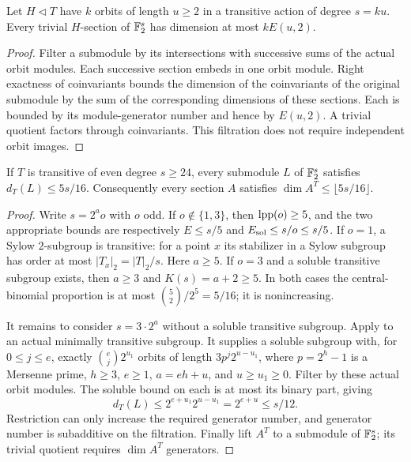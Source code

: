 \begin{lemma}\label{lem:orbit-filtration}
Let $H\lhd T$ have $k$ orbits of length $u\geq2$ in a transitive
action of degree $s=ku$. Every trivial $H$-section of $\mathbb F_2^s$ has
dimension at most $kE(u,2)$.
\end{lemma}
\begin{proof}
Filter a submodule by its intersections with successive sums of the
actual orbit modules. Each successive section embeds in one orbit
module. Right exactness of coinvariants bounds the dimension of the
coinvariants of the original submodule by the sum of the corresponding
dimensions of these sections. Each is bounded by its module-generator
number and hence by $E(u,2)$. A trivial quotient factors through
coinvariants. This filtration does not require independent orbit images.
\end{proof}

\begin{lemma}\label{lem:five-sixteenths}
If $T$ is transitive of even degree $s\geq24$, every submodule $L$ of
$\mathbb F_2^s$ satisfies $d_T(L)\leq5s/16$. Consequently every section $A$
satisfies $\dim A^T\leq\lfloor5s/16\rfloor$.
\end{lemma}
\begin{proof}
Write $s=2^ao$ with $o$ odd. If $o\notin\{1,3\}$, then
$\operatorname{lpp}(o)\geq5$, and the two appropriate bounds are respectively
$E\leq s/5$ and $E_{\rm sol}\leq s/o\leq s/5$.
If $o=1$, a Sylow $2$-subgroup is transitive: for a point $x$ its
stabilizer in a Sylow subgroup has order at most $|T_x|_2=|T|_2/s$.
Here $a\geq5$. If $o=3$ and a soluble transitive subgroup exists, then
$a\geq3$ and $K(s)=a+2\geq5$. In both cases the central-binomial
proportion is at most $\binom52/2^5=5/16$; it is nonincreasing.

It remains to consider $s=3\cdot2^a$ without a soluble transitive
subgroup. Apply \cite[Corollary 3.12]{Tracey2018} to an actual minimally
transitive subgroup. It supplies a soluble subgroup with, for
$0\leq j\leq e$, exactly $\binom ej2^{u_1}$ orbits of length
$3p^j2^{u-u_1}$, where $p=2^h-1$ is a Mersenne prime,
$h\geq3$, $e\geq1$, $a=eh+u$, and $u\geq u_1\geq0$.
Filter by these actual orbit modules. The soluble bound on each is at
most its binary part, giving
\[
 d_T(L)\leq2^{e+u_1}2^{u-u_1}=2^{e+u}\leq s/12.
\]
Restriction can only increase the required generator number, and
generator number is subadditive on the filtration. Finally lift $A^T$
to a submodule of $\mathbb F_2^s$; its trivial quotient requires
$\dim A^T$ generators.
\end{proof}

